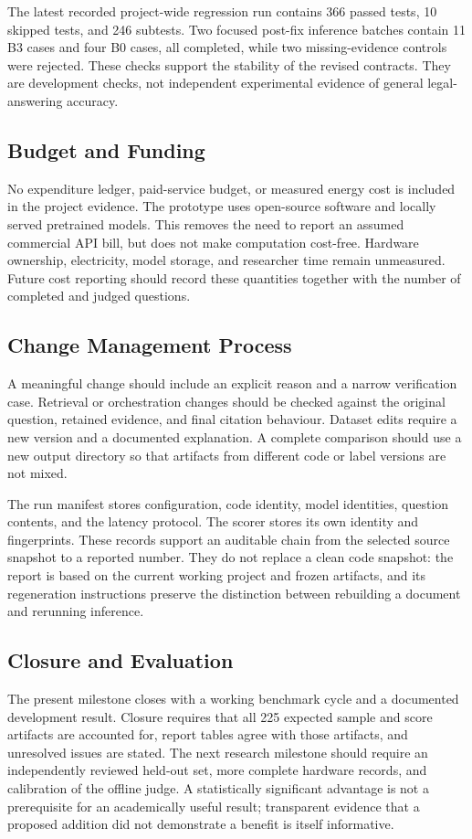 The latest recorded project-wide regression run contains 366 passed tests, 10 skipped tests, and 246 subtests. Two focused post-fix inference batches contain 11 B3 cases and four B0 cases, all completed, while two missing-evidence controls were rejected. These checks support the stability of the revised contracts. They are development checks, not independent experimental evidence of general legal-answering accuracy.

\subsection{Budget and Funding}
No expenditure ledger, paid-service budget, or measured energy cost is included in the project evidence. The prototype uses open-source software and locally served pretrained models. This removes the need to report an assumed commercial API bill, but does not make computation cost-free. Hardware ownership, electricity, model storage, and researcher time remain unmeasured. Future cost reporting should record these quantities together with the number of completed and judged questions.

\subsection{Change Management Process}
A meaningful change should include an explicit reason and a narrow verification case. Retrieval or orchestration changes should be checked against the original question, retained evidence, and final citation behaviour. Dataset edits require a new version and a documented explanation. A complete comparison should use a new output directory so that artifacts from different code or label versions are not mixed.

The run manifest stores configuration, code identity, model identities, question contents, and the latency protocol. The scorer stores its own identity and fingerprints. These records support an auditable chain from the selected source snapshot to a reported number. They do not replace a clean code snapshot: the report is based on the current working project and frozen artifacts, and its regeneration instructions preserve the distinction between rebuilding a document and rerunning inference.

\subsection{Closure and Evaluation}
The present milestone closes with a working benchmark cycle and a documented development result. Closure requires that all 225 expected sample and score artifacts are accounted for, report tables agree with those artifacts, and unresolved issues are stated. The next research milestone should require an independently reviewed held-out set, more complete hardware records, and calibration of the offline judge. A statistically significant advantage is not a prerequisite for an academically useful result; transparent evidence that a proposed addition did not demonstrate a benefit is itself informative.
